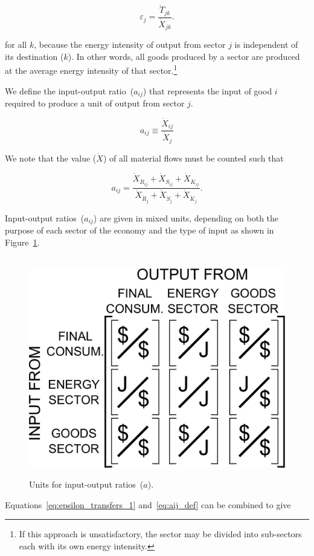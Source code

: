 \begin{equation} \label{eq:epsilon_transfers_1}
	\varepsilon_{j} = \frac{\dot{T}_{jk}}{\dot{X}_{jk}}.
\end{equation}

\noindent{}for all $k$, because the energy intensity 
of output from sector $j$ is independent of its destination ($k$). 
In other words, all goods produced by a sector 
are produced at the average energy intensity 
of that sector.\footnote{If this approach is unsatisfactory, 
the sector may be divided into sub-sectors 
each with its own energy intensity.}

We define the input-output ratio~($a_{ij}$)
that represents the input 
of good $i$ required to produce a unit of output from sector $j$.

\begin{equation} \label{eq:aij_def}
	a_{ij} \equiv \frac{\dot{X}_{ij}}{\dot{X}_{j}}
\end{equation}

We note that the value ($\dot{X}$) of all material flows must be counted such that

\begin{equation} \label{eq:aij_def_expanded}
	a_{ij} =	 
	\frac{\dot{X}_{\dot{R}_{ij}} + \dot{X}_{\dot{S}_{ij}} + \dot{X}_{\dot{K}_{ij}}}
		{\dot{X}_{\dot{R}_{j}} + \dot{X}_{\dot{S}_{j}} + \dot{X}_{\dot{K}_{j}}}.
\end{equation}

Input-output ratios~($a_{ij}$) are given in mixed units, 
depending on both the purpose of each sector of the economy 
and the type of input as shown in Figure~\ref{fig:A_matrix_units}.

\begin{figure}[h!]
\centering\
\includegraphics[width=0.4\linewidth]{Part_2/Chapter_Intensity/images/I-O_units.pdf}
\caption[Units for input-output ratios]{Units for input-output 
ratios~($a$).}
\label{fig:A_matrix_units}
\end{figure}

Equations~\ref{eq:epsilon_transfers_1} and~\ref{eq:aij_def} can be combined to give

